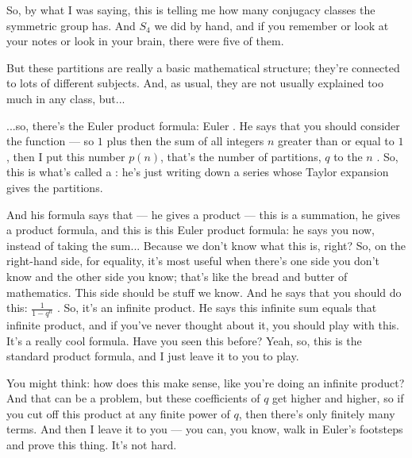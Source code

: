\begin{speech}[01:25:10 - 01:25:55]
 So, by what I was saying, this is telling me how many conjugacy classes the symmetric group has. And $S_4$ we did by hand, and if you remember or look at your notes or look in your brain, there were five of them.

But these partitions are really a basic mathematical structure; they're connected to lots of different subjects. And, as usual, they are not usually explained too much in any class, but...
\end{speech}

\begin{speech}[01:25:55 - 01:27:25]
...so, there's the Euler product formula: Euler . He says that you should consider the function --- so $1$ plus then the sum of all integers $n$ greater than or equal to $1$, then I put this number $p(n)$, that's the number of partitions, $q$ to the $n$ . So, this is what's called a : he's just writing down a series whose Taylor expansion gives the partitions.

And his formula says that --- he gives a product --- this is a summation, he gives a product formula, and this is this Euler product formula: he says you now, instead of taking the sum... Because we don't know what this is, right? So, on the right-hand side, for equality, it's most useful when there's one side you don't know and the other side you know; that's like the bread and butter of mathematics. This side should be stuff we know. And he says that you should do this: $\frac{1}{1 - q^n}$ . So, it's an infinite product. He says this infinite sum equals that infinite product, and if you've never thought about it, you should play with this. It's a really cool formula. Have you seen this before? Yeah, so, this is the standard product formula, and I just leave it to you to play.

You might think: how does this make sense, like you're doing an infinite product? And that can be a problem, but these coefficients of $q$ get higher and higher, so if you cut off this product at any finite power of $q$, then there's only finitely many terms. And then I leave it to you --- you can, you know, walk in Euler's footsteps and prove this thing. It's not hard.
\end{speech}

